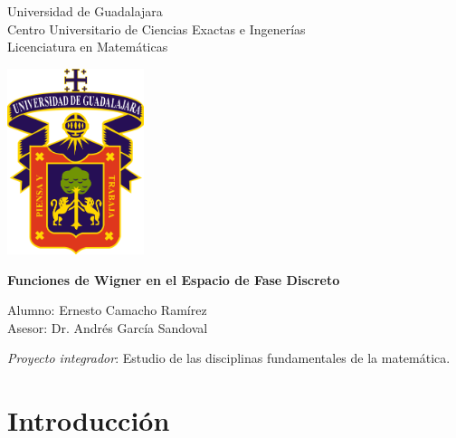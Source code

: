 \documentclass[a4paper]{report}
\begin{document}
  \begin{titlepage}
    \begin{center}
      \vspace{1.0in}

      \huge
      Universidad de Guadalajara\\
      \vspace{0.2cm}
      \large
      Centro Universitario de Ciencias Exactas e Ingenerías\\
      Licenciatura en Matemáticas\\

      \vspace{0.5in}

      \includegraphics[width=0.3\textwidth]{imgs/udg}
      
      \vspace{0.5in}

      \huge
      \textbf{
        Funciones de Wigner en el Espacio de Fase Discreto
      }

      \large
      \vspace{1.0in}
      
      Alumno: Ernesto Camacho Ramírez \\
      \vspace{0.2cm}
      Asesor: Dr. Andrés García Sandoval \\

      \vfill
           
      \textit{Proyecto integrador}: Estudio de las
      disciplinas fundamentales de la matemática.
     \end{center}
  \end{titlepage}

  \tableofcontents

  \newpage
  \section{Introducción}
\end{document}
